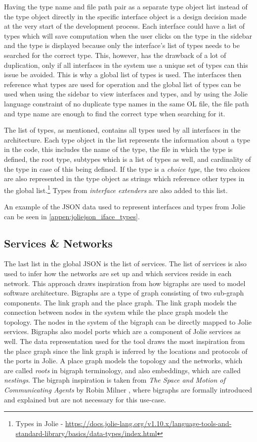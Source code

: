 Having the type name and file path pair as a separate type object list instead of the type object directly in the specific interface object is a design decision made at the very start of the development process.
Each interface could have a list of types which will save computation when the user clicks on the type in the sidebar and the type is displayed because only the interface's list of types needs to be searched for the correct type.
This, however, has the drawback of a lot of duplication, only if all interfaces in the system use a unique set of types can this issue be avoided.
This is why a global list of types is used. The interfaces then reference what types are used for operation and the global list of types can be used when using the sidebar to view interfaces and types, and by
using the Jolie language constraint of no duplicate type names in the same OL file, the file path and type name are enough to find the correct type when searching for it.

The list of types, as mentioned, contains all types used by all interfaces in the architecture.
Each type object in the list represents the information about a type in the code, this includes the name of the type, the file in which the type is defined, the root type, subtypes which is a list of types as well, and cardinality of the type in case of this being defined.
If the type is a \textit{choice type}, the two choices are also represented in the type object as strings which reference other types in the global list.\footnote{Types in Jolie - \url{https://docs.jolie-lang.org/v1.10.x/language-tools-and-standard-library/basics/data-types/index.html}}
Types from \textit{interface extenders} are also added to this list.

An example of the JSON data used to represent interfaces and types from Jolie can be seen in \cref{appen:joliejson_iface_types}.

\subsection{Services \& Networks}
The last list in the global JSON is the list of services. The list of services is also used to infer how the networks are set up and which services reside in each network.
This approach draws inspiration from how bigraphs are used to model software architecture. Bigraphs are a type of graph consisting of two sub-graph components. The link graph and the place graph. The link graph models the connection between nodes in the system while the place graph models the topology.
The nodes in the system of the bigraph can be directly mapped to Jolie services. Bigraphs also model ports which are a component of Jolie services as well.
The data representation used for the tool draws the most inspiration from the place graph since the link graph is inferred by the locations and protocols of the ports in Jolie.
A place graph models the topology and the networks, which are called \textit{roots} in bigraph terminology, and also embeddings, which are called \textit{nestings}.
The bigraph inspiration is taken from \textit{The Space and Motion of Communicating Agents} by Robin Milner \cite{BigraphBook}, where bigraphs are formally introduced and explained but are not necessary for this use-case.

